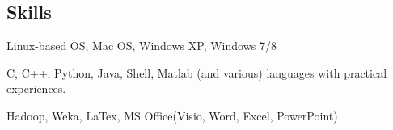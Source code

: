 \documentclass[]{article}
\renewenvironment{description}{
  \begin{basedescript}{\desclabelstyle{\pushlabel}\desclabelwidth{10em}}
}{
  \end{basedescript}
}
\begin{document}
\subsection{Skills}\label{skills}

\begin{description}
\item[Operating System]
Linux-based OS, Mac OS, Windows XP, Windows 7/8
\item[Programming Language]
C, C++, Python, Java, Shell, Matlab (and various) languages with
practical experiences.
\item[Others]
Hadoop, Weka, LaTex, MS Office(Visio, Word, Excel, PowerPoint)
\end{description}
\end{document}
